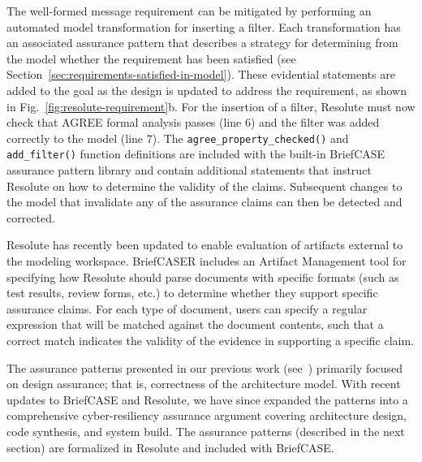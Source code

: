 The well-formed message requirement can be mitigated by performing an automated model transformation for inserting a filter. Each transformation has an associated assurance pattern that describes a strategy for determining from the model whether the requirement has been satisfied (see Section~\ref{sec:requirements-satisfied-in-model}).  
These evidential statements are added to the goal as the design is updated to address the requirement, as shown in Fig.~\ref{fig:resolute-requirement}b.  For the insertion of a filter, Resolute must now check that AGREE formal analysis passes (line 6) and the filter was added correctly to the model (line 7).  The \texttt{agree\_property\_checked()} and \texttt{add\_filter()} function definitions are included with the built-in BriefCASE assurance pattern library and contain additional statements that instruct Resolute on how to determine the validity of the claims. 
Subsequent changes to the model that invalidate any of the assurance claims can then be detected and corrected.  

Resolute has recently been updated to enable evaluation of artifacts external to the modeling workspace. BriefCASER includes an Artifact Management tool for specifying how Resolute should parse documents with specific formats (such as test results, review forms, etc.) to determine whether they support specific assurance claims.  For each type of document, users can specify a regular expression that will be matched against the document contents, such that a correct match indicates the validity of the evidence in supporting a specific claim.

The assurance patterns presented in our previous work (see~\cite{resolute-destion}) primarily focused on design assurance; that is, correctness of the architecture model.  With recent updates to BriefCASE and Resolute, we have since expanded the patterns into a comprehensive cyber-resiliency assurance argument covering architecture design, code synthesis, and system build.  The assurance patterns (described in the next section) are formalized in Resolute and included with BriefCASE.
